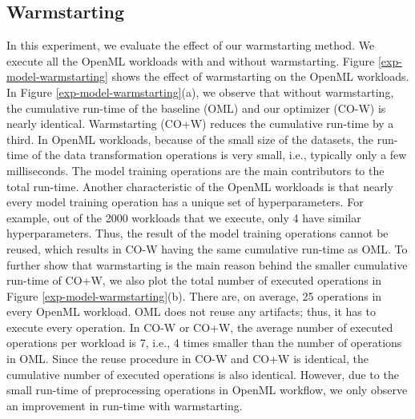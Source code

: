 \subsection{Warmstarting}
In this experiment, we evaluate the effect of our warmstarting method.
We execute all the OpenML workloads with and without warmstarting.
Figure \ref{exp-model-warmstarting} shows the effect of warmstarting on the OpenML workloads.
In Figure \ref{exp-model-warmstarting}(a), we observe that without warmstarting, the cumulative run-time of the baseline (OML) and our optimizer (CO-W) is nearly identical.
Warmstarting (CO+W) reduces the cumulative run-time by a third.
In OpenML workloads, because of the small size of the datasets, the run-time of the data transformation operations is very small, i.e., typically only a few milliseconds.
The model training operations are the main contributors to the total run-time.
Another characteristic of the OpenML workloads is that nearly every model training operation has a unique set of hyperparameters.
For example, out of the 2000 workloads that we execute, only 4 have similar hyperparameters.
Thus, the result of the model training operations cannot be reused, which results in CO-W having the same cumulative run-time as OML.
To further show that warmstarting is the main reason behind the smaller cumulative run-time of CO+W, we also plot the total number of executed operations in Figure \ref{exp-model-warmstarting}(b).
There are, on average, 25 operations in every OpenML workload.
OML does not reuse any artifacts; thus, it has to execute every operation.
In CO-W or CO+W, the average number of executed operations per workload is 7, i.e., 4 times smaller than the number of operations in OML.
Since the reuse procedure in CO-W and CO+W is identical, the cumulative number of executed operations is also identical.
However, due to the small run-time of preprocessing operations in OpenML workflow, we only observe an improvement in run-time with warmstarting.  